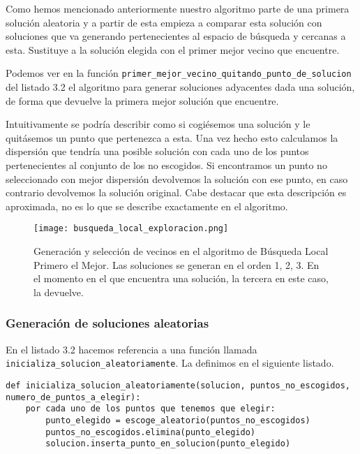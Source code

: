 Como hemos mencionado anteriormente nuestro algoritmo parte de una primera solución aleatoria y a partir de esta empieza
a comparar esta solución con soluciones que va generando pertenecientes al espacio de búsqueda y cercanas a esta. Sustituye
a la solución elegida con el primer mejor vecino que encuentre.

Podemos ver en la función \texttt{primer\_mejor\_vecino\_quitando\_punto\_de\_solucion} del listado 3.2 el algoritmo
para generar soluciones adyacentes dada una solución, de forma que devuelve la primera mejor solución que encuentre.

Intuitivamente se podría describir como si cogiésemos una solución y le quitásemos un punto que pertenezca a esta.
Una vez hecho esto calculamos la dispersión que tendría una posible solución con cada uno de los puntos pertenecientes
al conjunto de los no escogidos. Si encontramos un punto no seleccionado con mejor dispersión devolvemos la solución
con ese punto, en caso contrario devolvemos la solución original. Cabe destacar que esta descripción es aproximada,
no es lo que se describe exactamente en el algoritmo.

\begin{figure}[ht]
    \centering
    \texttt{[image: busqueda\_local\_exploracion.png]}
    \caption{Generación y selección de vecinos en el algoritmo de Búsqueda Local Primero el Mejor. Las soluciones se generan en el orden 1, 2, 3. En el momento en el que encuentra una solución, la tercera en este caso, la devuelve.}
\end{figure}

\subsubsection{Generación de soluciones aleatorias}

En el listado 3.2 hacemos referencia a una función llamada \texttt{inicializa\_solucion\_aleatoriamente}.
La definimos en el siguiente listado.

\begin{minipage}{\textwidth}
\begin{lstlisting}[mathescape=true,caption={Definición de la función \texttt{inicializa\_solucion\_aleatoriamente} para generar una solución consistente en elementos aleatorios.},captionpos=b]
def inicializa_solucion_aleatoriamente(solucion, puntos_no_escogidos, numero_de_puntos_a_elegir):
    por cada uno de los puntos que tenemos que elegir:
        punto_elegido = escoge_aleatorio(puntos_no_escogidos)
        puntos_no_escogidos.elimina(punto_elegido)
        solucion.inserta_punto_en_solucion(punto_elegido)
\end{lstlisting}
\end{minipage}